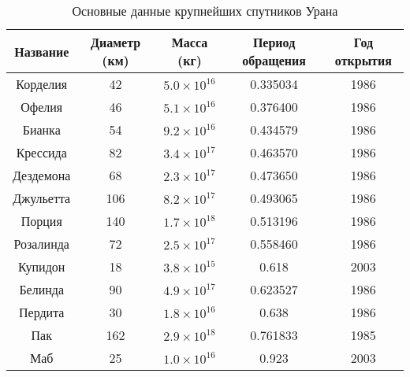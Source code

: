\documentclass[30pt]{article}
\begin{document}
        \begin{table}[h!]
            \begin{tabularx}{\textwidth}{
        |C{0.15}|C{0.24}|C{0.2}|C{0.22}|C{0.17}| }
                \hline
                \textbf{Название} & \textbf{Диаметр (км)} & \textbf{Масса (кг)} & \bfseries{Период обращения} & \bfseries{Год открытия}\\
                \hline 
                Корделия & 42 & $5.0\times10^{16}$ & 0.335034 & 1986 \\
                \hline
                Офелия & 46 & $5.1\times10^{16}$ & 0.376400 & 1986 \\
                \hline
                Бианка & 54 & $9.2\times10^{16}$ & 0.434579 & 1986 \\
                \hline
                Крессида & 82 & $3.4\times10^{17}$ & 0.463570 & 1986 \\
                \hline
                Дездемона & 68 & $2.3\times10^{17}$ & 0.473650 & 1986 \\
                \hline
                Джульетта & 106 & $8.2\times10^{17}$ & 0.493065 & 1986 \\
                \hline
                Порция & 140 & $1.7\times10^{18}$ & 0.513196 & 1986 \\
                \hline
                Розалинда & 72 & $2.5\times10^{17}$ & 0.558460 & 1986 \\
                \hline
                Купидон & 18 & $3.8\times10^{15}$ & 0.618 & 2003 \\
                \hline
                Белинда & 90 & $4.9\times10^{17}$ & 0.623527 & 1986 \\
                \hline
                Пердита & 30 & $1.8\times10^{16}$ & 0.638 & 1986 \\
                \hline
                Пак & 162 & $2.9\times10^{18}$ & 0.761833 & 1985 \\
                \hline
                Маб & 25 & $1.0\times10^{16}$ & 0.923 & 2003 \\
                \hline
            \end{tabularx}
            \caption{Основные данные крупнейших спутников Урана\label{tbl:moons}}
        \end{table}
\end{document}
